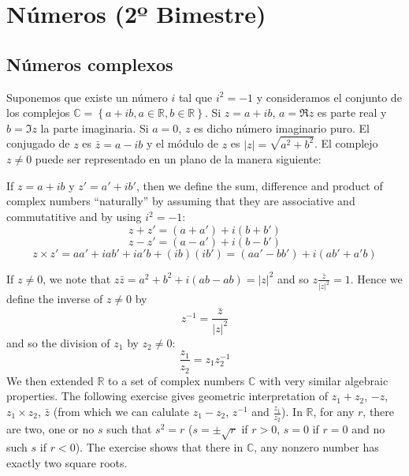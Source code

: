 \chapter{Números (2º Bimestre)}

\section{Números complexos}

Suponemos que existe un número $i$ tal que $i^2 = -1$ y consideramos el
conjunto de los complejos
$\mathbb{C} = \left\{ a + ib, a \in \mathbb{R}, b \in \mathbb{R} \right\}$.
Si $z = a + ib$, $a = \Re z$ es parte real y $b = \Im z$ la parte imaginaria.
Si $a = 0$,
$z$ es dicho número imaginario puro.
El conjugado de $z$ es $\bar{z} = a - i b$ y el módulo de $z$ es
${|z|} = \sqrt{a^2 + b^2}$. El complejo $z \neq 0$
puede ser representado en un plano de la manera siguiente:

\begin{center}
\end{center}

If $z = a+ib$ y $z' = a'+ib'$, then we define the sum, difference and product
of complex numbers ``naturally'' by assuming that they are associative and
commutatitive and by using $i^2=-1$:
$$z + z' = {(a+a')} + i (b+b')$$
$$z - z' = {(a-a')} + i {(b-b')}$$
$$z \times z' = {a a'} + {i ab'} + {i a'b} + {(ib)(ib')} =
{(aa' - bb')} + i {(ab' + a'b)}$$

If $z \neq 0$, we note that $z \bar{z} = a^2 + b^2 + i {(ab - ab)} = {|z|}^2$
and so $z \frac{\bar{z}}{{|z|}^2} = 1$. Hence we define the inverse of
$z \neq 0$ by
$$z^{-1} = \frac{\bar{z}}{{|z|}^2}$$
and so the division of $z_1$ by $z_2\neq0$:
$$\frac{z_1}{z_2} = z_1 z_2^{-1}$$
We then extended $\mathbb R$ to a set of complex numbers $\mathbb C$ with
very similar algebraic properties. The following exercise gives geometric
interpretation of $z_1+z_2$, $-z$, $z_1 \times z_2$, $\bar z$ (from which we
can calulate $z_1-z_2$, $z^{-1}$ and $\frac{z_1}{z_2}$). In $\mathbb R$, for
any $r$, there are two, one or no $s$ such that $s^2 = r$
($s=\pm\sqrt{r}$ if $r > 0$, $s=0$ if $r=0$ and no such $s$ if $r<0$). The
exercise shows that there in $\mathbb C$, any nonzero number has exactly
two square roots.

